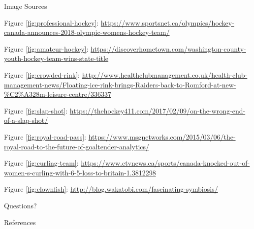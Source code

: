 \begin{frame}[allowframebreaks]{Image Sources}

\footnotesize

Figure
\ref{fig:professional-hockey}:
\url{
https://www.sportsnet.ca/olympics/hockey-canada-announces-2018-olympic-womens-hockey-team/
}

Figure
\ref{fig:amateur-hockey}:
\url{
https://discoverhometown.com/washington-county-youth-hockey-team-wins-state-title
}

Figure
\ref{fig:crowded-rink}:
\url{
http://www.healthclubmanagement.co.uk/health-club-management-news/Floating-ice-rink-brings-Raiders-back-to-Romford-at-new-%
}

Figure
\ref{fig:slap-shot}:
\url{
https://thehockey411.com/2017/02/09/on-the-wrong-end-of-a-slap-shot/
}

Figure
\ref{fig:royal-road-pass}:
\url{
https://www.msgnetworks.com/2015/03/06/the-royal-road-to-the-future-of-goaltender-analytics/
}

Figure
\ref{fig:curling-team}:
\url{
https://www.ctvnews.ca/sports/canada-knocked-out-of-women-s-curling-with-6-5-loss-to-britain-1.3812298
}

Figure
\ref{fig:clownfish}:
\url{
http://blog.wakatobi.com/fascinating-symbiosis/
}

\end{frame}

\begin{frame}[standout]
  Questions?
\end{frame}

\begin{frame}[allowframebreaks]{References}

  
  
\end{frame}
